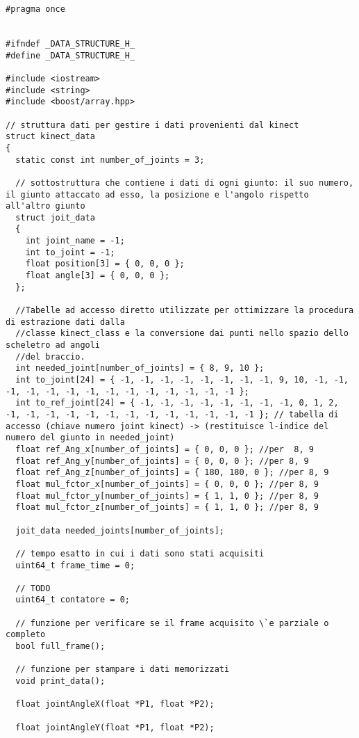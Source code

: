 \documentclass[10pt,a4paper]{article}
\begin{document}
\begin{lstlisting}[style=mycpp, caption=librerie usate, captionpos=b]
#pragma once


#ifndef _DATA_STRUCTURE_H_
#define _DATA_STRUCTURE_H_

#include <iostream>
#include <string>
#include <boost/array.hpp>

// struttura dati per gestire i dati provenienti dal kinect
struct kinect_data
{
  static const int number_of_joints = 3;

  // sottostruttura che contiene i dati di ogni giunto: il suo numero, il giunto attaccato ad esso, la posizione e l'angolo rispetto all'altro giunto
  struct joit_data
  {
    int joint_name = -1;
    int to_joint = -1;
    float position[3] = { 0, 0, 0 };
    float angle[3] = { 0, 0, 0 };
  };

  //Tabelle ad accesso diretto utilizzate per ottimizzare la procedura di estrazione dati dalla
  //classe kinect_class e la conversione dai punti nello spazio dello scheletro ad angoli 
  //del braccio. 
  int needed_joint[number_of_joints] = { 8, 9, 10 };
  int to_joint[24] = { -1, -1, -1, -1, -1, -1, -1, -1, 9, 10, -1, -1, -1, -1, -1, -1, -1, -1, -1, -1, -1, -1, -1, -1 };
  int to_ref_joint[24] = { -1, -1, -1, -1, -1, -1, -1, -1, 0, 1, 2, -1, -1, -1, -1, -1, -1, -1, -1, -1, -1, -1, -1, -1 }; // tabella di accesso (chiave numero joint kinect) -> (restituisce l-indice del numero del giunto in needed_joint)    
  float ref_Ang_x[number_of_joints] = { 0, 0, 0 }; //per  8, 9
  float ref_Ang_y[number_of_joints] = { 0, 0, 0 }; //per 8, 9
  float ref_Ang_z[number_of_joints] = { 180, 180, 0 }; //per 8, 9
  float mul_fctor_x[number_of_joints] = { 0, 0, 0 }; //per 8, 9
  float mul_fctor_y[number_of_joints] = { 1, 1, 0 }; //per 8, 9
  float mul_fctor_z[number_of_joints] = { 1, 1, 0 }; //per 8, 9

  joit_data needed_joints[number_of_joints];

  // tempo esatto in cui i dati sono stati acquisiti
  uint64_t frame_time = 0;

  // TODO
  uint64_t contatore = 0;

  // funzione per verificare se il frame acquisito \`e parziale o completo 
  bool full_frame();

  // funzione per stampare i dati memorizzati
  void print_data();

  float jointAngleX(float *P1, float *P2);

  float jointAngleY(float *P1, float *P2);


\end{lstlisting}
\end{document}
